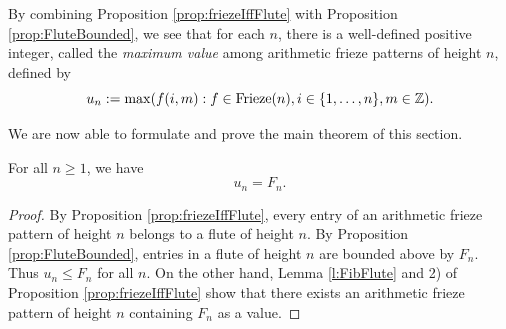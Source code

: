 By combining Proposition \ref{prop:friezeIffFlute} with Proposition \ref{prop:FluteBounded}, we see that 
for each $n$, there is a well-defined positive integer, called the {\it maximum value} among arithmetic frieze patterns of height $n$, defined by
    \[
        u_n := \max ( f (i,m) : f \in  {\rm Frieze}(n), i \in \{1,\ldots, n\}, m \in \mathbb{Z}).
    \]



We are now able to formulate and prove the main theorem of this section.
\begin{theorem}
    \label{mainTheorem}
    \leanok
    For all $n \geq 1$, we have 
    \[
        u_n = F_{n}.
    \]    
\end{theorem}
\begin{proof}\leanok
    By Proposition \ref{prop:friezeIffFlute}, every entry of an arithmetic frieze pattern of height $n$ belongs to a flute of height $n$.
    By Proposition \ref{prop:FluteBounded}, entries in a flute of height $n$ are bounded above by $F_n$. Thus $u_n \leq F_n$ for all $n$. 
On the other hand, Lemma \ref{l:FibFlute} and 2) of Proposition \ref{prop:friezeIffFlute} show that 
there exists an arithmetic frieze pattern of height $n$ containing $F_n$ as a value.
\end{proof}


%



